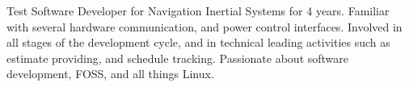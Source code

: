 

\begin{cvparagraph}

Test Software Developer for Navigation Inertial Systems for 4 years. Familiar with several hardware communication, and power control interfaces. Involved in all stages of the development cycle, and in technical leading activities such as estimate providing, and schedule tracking. Passionate about software development, FOSS, and all things Linux.

\end{cvparagraph}
